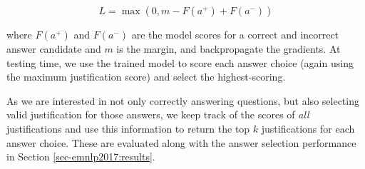 \begin{equation}
L = \max(0, m - F(a^{+}) + F(a^{-}))
\end{equation}

where $F(a^+)$ and $F(a^-)$ are the model scores for a correct and incorrect answer candidate and $m$ is the margin, and backpropagate the gradients.
At testing time, we use the trained model to score each answer choice (again using the maximum justification score) and select the highest-scoring.

As we are interested in not only correctly answering questions, but also selecting valid justification for those answers, we keep track of the scores of \emph{all} justifications and use this information to return the top $k$ justifications for each answer choice.  These are evaluated along with the answer selection performance in Section \ref{sec-emnlp2017:results}.

